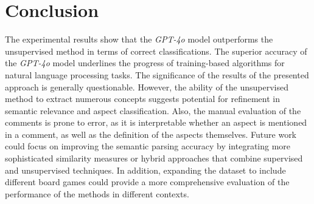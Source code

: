 \documentclass[sn-mathphys-num]{sn-jnl}%
\theoremstyle{thmstyleone}%
\theoremstyle{thmstyletwo}%
\theoremstyle{thmstylethree}%
\begin{document}
\section{Conclusion}\label{results}
    The experimental results show that the \textit{GPT-4o} model outperforms the unsupervised method in terms of correct classifications. The superior accuracy of the \textit{GPT-4o} model underlines the progress of training-based algorithms for natural language processing tasks. The significance of the results of the presented approach is generally questionable. However, the ability of the unsupervised method to extract numerous concepts suggests potential for refinement in semantic relevance and aspect classification. Also, the manual evaluation of the comments is prone to error, as it is interpretable whether an aspect is mentioned in a comment, as well as the definition of the aspects themselves. Future work could focus on improving the semantic parsing accuracy by integrating more sophisticated similarity measures or hybrid approaches that combine supervised and unsupervised techniques. In addition, expanding the dataset to include different board games could provide a more comprehensive evaluation of the performance of the methods in different contexts.

\pagebreak







\end{document}
